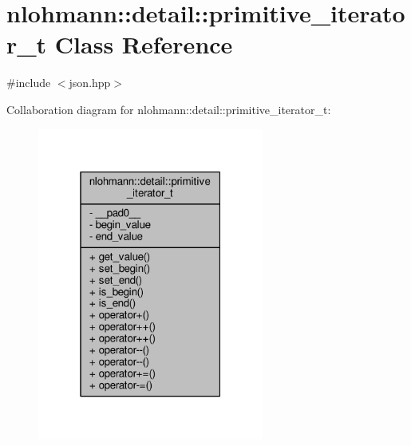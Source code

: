 \hypertarget{classnlohmann_1_1detail_1_1primitive__iterator__t}{}\section{nlohmann\+:\+:detail\+:\+:primitive\+\_\+iterator\+\_\+t Class Reference}
\label{classnlohmann_1_1detail_1_1primitive__iterator__t}


{\ttfamily \#include $<$json.\+hpp$>$}



Collaboration diagram for nlohmann\+:\+:detail\+:\+:primitive\+\_\+iterator\+\_\+t\+:
\nopagebreak
\begin{figure}[H]
\begin{center}
\leavevmode
\includegraphics[width=211pt]{classnlohmann_1_1detail_1_1primitive__iterator__t__coll__graph}
\end{center}
\end{figure}
